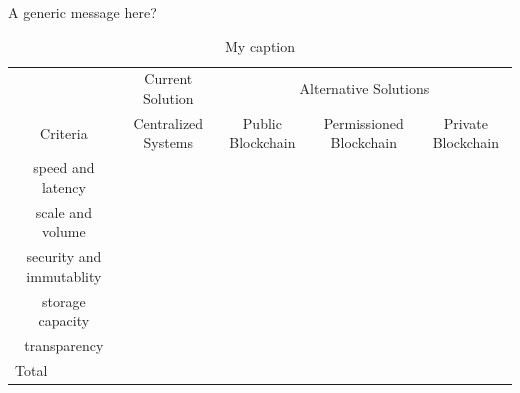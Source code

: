 \begin{warpHTML}

A generic message here? 

\begin{table}
\centering
\caption{My caption}
\begin{tabular}{cllll}
\multicolumn{1}{l}{}      & \multicolumn{1}{c}{Current Solution}    & \multicolumn{3}{c}{Alternative Solutions}                                                                                    \\
Criteria                  & \multicolumn{1}{c}{Centralized Systems} & \multicolumn{1}{c}{Public Blockchain} & \multicolumn{1}{c}{Permissioned Blockchain} & \multicolumn{1}{c}{Private Blockchain} \\
speed and latency         &                                         &                                       &                                             &                                        \\
scale and volume          &                                         &                                       &                                             &                                        \\
security and immutablity  &                                         &                                       &                                             &                                        \\
storage capacity          &                                         &                                       &                                             &                                        \\
transparency              &                                         &                                       &                                             &                                        \\
\multicolumn{1}{l}{Total} &                                         &                                       &                                             &                                       
\end{tabular}
\end{table}
\end{warpHTML}